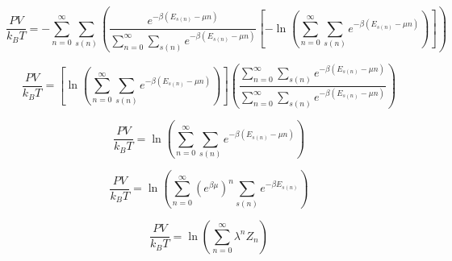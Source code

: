 \documentclass[double,12pt]{beavtex}
\begin{document}
\begin{equation}\frac{PV}{k_BT}=-\sum_{n=0}^\infty\sum_{s(n)}\left(\frac{e^{-\beta(E_{s(n)}-\mu{n})}}{\sum_{n=0}^\infty\sum_{s(n)}e^{-\beta(E_{s(n)}-\mu{n})}} \left[-\ln{\left(\sum_{n=0}^\infty\sum_{s(n)}e^{-\beta(E_{s(n)}-\mu{n})}\right)}\right]\right)\end{equation}

\begin{equation}\frac{PV}{k_BT}=\left[\ln{\left(\sum_{n=0}^\infty\sum_{s(n)}e^{-\beta(E_{s(n)}-\mu{n})}\right)}\right]\left(\frac{\sum_{n=0}^\infty\sum_{s(n)}e^{-\beta(E_{s(n)}-\mu{n})}}{\sum_{n=0}^\infty\sum_{s(n)}e^{-\beta(E_{s(n)}-\mu{n})}}\right) \end{equation}

\begin{equation}\frac{PV}{k_BT}=\ln{\left(\sum_{n=0}^\infty\sum_{s(n)}e^{-\beta(E_{s(n)}-\mu{n})}\right)} \end{equation}

\begin{equation}\frac{PV}{k_BT}=\ln{\left(\sum_{n=0}^\infty \left(e^{\beta\mu}\right)^n\sum_{s(n)}e^{-\beta{E}_{s(n)}}\right)} \end{equation}

\begin{equation}\frac{PV}{k_BT}=\ln{\left(\sum_{n=0}^\infty \lambda^nZ_n\right)} \end{equation}
\end{document}
